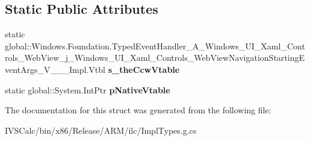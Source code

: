 \subsection*{Static Public Attributes}
\begin{DoxyCompactItemize}
\item 
\mbox{\label{struct_windows_1_1_foundation_1_1_typed_event_handler___a___windows___u_i___xaml___controls___we35912db850c22c9b2be1a07564605cd2_ae95f2257fc06e90520f494e3d5d518c5}} 
static global\+::\+Windows.\+Foundation.\+Typed\+Event\+Handler\+\_\+\+A\+\_\+\+Windows\+\_\+\+U\+I\+\_\+\+Xaml\+\_\+\+Controls\+\_\+\+Web\+View\+\_\+j\+\_\+\+Windows\+\_\+\+U\+I\+\_\+\+Xaml\+\_\+\+Controls\+\_\+\+Web\+View\+Navigation\+Starting\+Event\+Args\+\_\+\+V\+\_\+\+\_\+\+\_\+\+Impl.\+Vtbl {\bfseries s\+\_\+the\+Ccw\+Vtable}
\item 
\mbox{\label{struct_windows_1_1_foundation_1_1_typed_event_handler___a___windows___u_i___xaml___controls___we35912db850c22c9b2be1a07564605cd2_a95f57a185f418984f7d97754933250bc}} 
static global\+::\+System.\+Int\+Ptr {\bfseries p\+Native\+Vtable}
\end{DoxyCompactItemize}


The documentation for this struct was generated from the following file\+:\begin{DoxyCompactItemize}
\item 
I\+V\+S\+Calc/bin/x86/\+Release/\+A\+R\+M/ilc/Impl\+Types.\+g.\+cs\end{DoxyCompactItemize}
